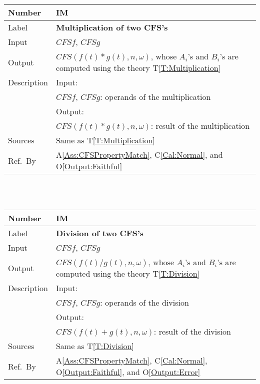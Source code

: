 \documentclass[12pt]{article}
\newcommand{\colAwidth}{0.13\textwidth}
\newcommand{\colBwidth}{0.82\textwidth}
\newcommand{\tref}[1]{T\ref{#1}}
\newcommand{\aref}[1]{A\ref{#1}}
\newcommand{\calref}[1]{C\ref{#1}}
\newcommand{\oref}[1]{O\ref{#1}}
\newcounter{instnum} %
\begin{document}
\noindent
\begin{minipage}{\textwidth}
	\renewcommand*{\arraystretch}{1.5}
	\begin{tabular}{| p{\colAwidth} | p{\colBwidth}|}
		\hline
		\rowcolor[gray]{0.9}
		Number& IM{instnum}\theinstnum 
		\label{IM:Multiplication}\\
		\hline
		Label& \bf Multiplication of two CFS's \\
		\hline
		Input& $\mathit{CFSf}$, $\mathit{CFSg}$\\
		\hline
		Output& $\mathit{CFS}(f(t)*g(t), n, \omega)$, whose $A_i$'s 
		and $B_i$'s are computed using the theory 
		\tref{T:Multiplication}\\
		\hline
		Description&Input:\\
		&$\mathit{CFSf}$, $\mathit{CFSg}$: operands of the 
		multiplication\\
		&Output:\\
		& $\mathit{CFS}(f(t)*g(t), n, \omega)$: result 
		of the multiplication\\
		\hline
		Sources&Same as \tref{T:Multiplication}\\
		\hline
		Ref.\ By & \aref{Ass:CFSPropertyMatch}, \calref{Cal:Normal}, 
		and \oref{Output:Faithful}\\
		\hline
	\end{tabular}
\end{minipage}\\
~\newline

\noindent
\begin{minipage}{\textwidth}
	\renewcommand*{\arraystretch}{1.5}
	\begin{tabular}{| p{\colAwidth} | p{\colBwidth}|}
		\hline
		\rowcolor[gray]{0.9}
		Number& IM{instnum}\theinstnum 
		\label{IM:Division}\\
		\hline
		Label& \bf Division of two CFS's \\
		\hline
		Input& $\mathit{CFSf}$, $\mathit{CFSg}$\\
		\hline
		Output& $\mathit{CFS}(f(t)/g(t), n, \omega)$, whose $A_i$'s 
		and $B_i$'s are computed using the theory 
		\tref{T:Division}\\
		\hline
		Description&Input:\\
		&$\mathit{CFSf}$, $\mathit{CFSg}$: operands of 
		the division\\
		&Output:\\
		& $\mathit{CFS}(f(t)+g(t), n, \omega)$: result of 
		the division\\
		\hline
		Sources&Same as \tref{T:Division}		\\
		\hline
		Ref.\ By & \aref{Ass:CFSPropertyMatch}, 
		\calref{Cal:Normal}, 
		\oref{Output:Faithful}, and \oref{Output:Error}\\
		\hline
	\end{tabular}
\end{minipage}\\
~\newline
\end{document}
